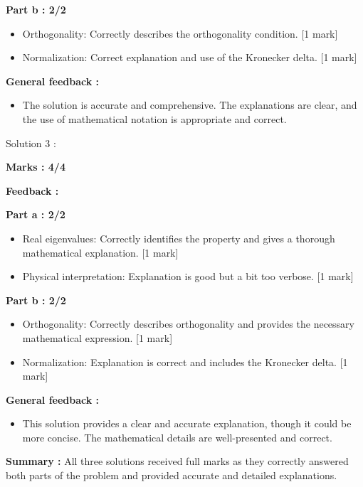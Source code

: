\documentclass[a4paper,11pt]{article}
\begin{document}
\textbf{Part b : 2/2}

\begin{itemize}
    \item Orthogonality: Correctly describes the orthogonality condition. [1 mark]
    \item Normalization: Correct explanation and use of the Kronecker delta. [1 mark]
\end{itemize}


\textbf{General feedback :}

\begin{itemize}
    \item The solution is accurate and comprehensive. The explanations are clear, and the use of mathematical notation is appropriate and correct.
\end{itemize}


Solution 3 : 

\textbf{Marks : 4/4}

\textbf{Feedback : }

\textbf{Part a : 2/2}

\begin{itemize}
    \item Real eigenvalues: Correctly identifies the property and gives a thorough mathematical explanation. [1 mark]
    \item Physical interpretation: Explanation is good but a bit too verbose. [1 mark]
\end{itemize}


\textbf{Part b : 2/2}

\begin{itemize}
    \item Orthogonality: Correctly describes orthogonality and provides the necessary mathematical expression. [1 mark]
    \item Normalization: Explanation is correct and includes the Kronecker delta. [1 mark]
\end{itemize}


\textbf{General feedback :}

\begin{itemize}
    \item This solution provides a clear and accurate explanation, though it could be more concise. The mathematical details are well-presented and correct.
\end{itemize}

\textbf{Summary :}
All three solutions received full marks as they correctly answered both parts of the problem and provided accurate and detailed explanations.
\end{document}
